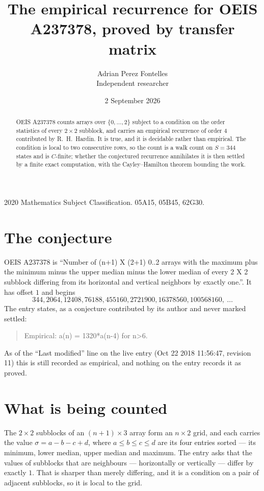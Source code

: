 \documentclass[11pt,a4paper]{article}
\title{The empirical recurrence for OEIS A237378, proved by transfer matrix}
\author{Adrian Perez Fontelles\\ \small Independent researcher}
\date{2 September 2026}
\theoremstyle{plain}
\theoremstyle{definition}
\begin{document}
\maketitle

\begin{abstract}
OEIS A237378 counts arrays over $\{0,\dots,2\}$ subject to a condition on the order
statistics of every $2\times2$ subblock, and carries an empirical recurrence of order
$4$ contributed by R.~H.~Hardin. It is true, and it is decidable rather than empirical.
The condition is local to two consecutive rows, so the count is a walk count on $S=344$
states and is $C$-finite; whether the conjectured recurrence annihilates it is then settled by
a finite exact computation, with the Cayley--Hamilton theorem bounding the work.
\end{abstract}

\noindent\small 2020 Mathematics Subject Classification. 05A15, 05B45, 62G30.\normalsize

\section{The conjecture}

OEIS A237378 is ``Number of (n+1) X (2+1) 0..2 arrays with the maximum plus the minimum minus the upper median minus the lower median of every 2 X 2 subblock differing from its horizontal and vertical neighbors by exactly one.''. It has offset $1$ and begins
\[
344, 2064, 12408, 76188, 455160, 2721900, 16378560, 100568160,\ \dots
\]
The entry states, as a conjecture contributed by its author and never marked settled:
\begin{quote}
Empirical: a(n) = 1320*a(n-4) for n>6.
\end{quote}
As of the ``Last modified'' line on the live entry (Oct 22 2018 11:56:47, revision 11) this is still
recorded as empirical, and nothing on the entry records it as proved.

\section{What is being counted}

The $2\times2$ subblocks of an $(n+1)\times3$ array form an
$n\times2$ grid, and each carries the value $\sigma=a-b-c+d$, where $a\le b\le c\le d$ are its four entries sorted --- its minimum, lower median, upper median and maximum. The entry asks that the values of
subblocks that are neighbours --- horizontally or vertically --- differ by exactly $1$.
That is sharper than merely differing, and it is a condition on a pair of adjacent subblocks,
so it is local to the grid.
\end{document}

